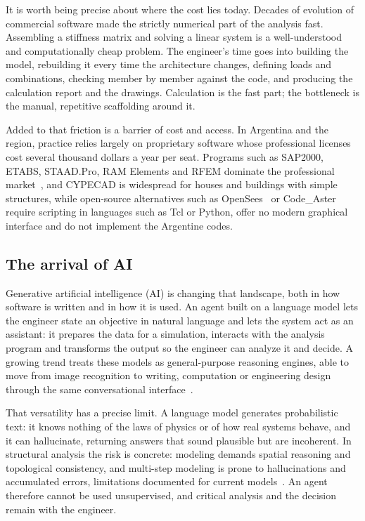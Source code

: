 \documentclass[11pt,a4paper]{article}
\begin{document}
It is worth being precise about where the cost lies today. Decades of evolution of commercial software made the strictly numerical part of the analysis fast. Assembling a stiffness matrix and solving a linear system is a well-understood and computationally cheap problem. The engineer's time goes into building the model, rebuilding it every time the architecture changes, defining loads and combinations, checking member by member against the code, and producing the calculation report and the drawings. Calculation is the fast part; the bottleneck is the manual, repetitive scaffolding around it.

Added to that friction is a barrier of cost and access. In Argentina and the region, practice relies largely on proprietary software whose professional licenses cost several thousand dollars a year per seat. Programs such as SAP2000, ETABS, STAAD.Pro, RAM Elements and RFEM dominate the professional market~\cite{ref1}, and CYPECAD is widespread for houses and buildings with simple structures, while open-source alternatives such as OpenSees~\cite{ref2} or Code\_Aster~\cite{ref3} require scripting in languages such as Tcl or Python, offer no modern graphical interface and do not implement the Argentine codes.

\subsection{The arrival of AI}\label{sec:1.2}

Generative artificial intelligence (AI) is changing that landscape, both in how software is written and in how it is used. An agent built on a language model lets the engineer state an objective in natural language and lets the system act as an assistant: it prepares the data for a simulation, interacts with the analysis program and transforms the output so the engineer can analyze it and decide. A growing trend treats these models as general-purpose reasoning engines, able to move from image recognition to writing, computation or engineering design through the same conversational interface~\cite{ref4,ref5}.

That versatility has a precise limit. A language model generates probabilistic text: it knows nothing of the laws of physics or of how real systems behave, and it can hallucinate, returning answers that sound plausible but are incoherent. In structural analysis the risk is concrete: modeling demands spatial reasoning and topological consistency, and multi-step modeling is prone to hallucinations and accumulated errors, limitations documented for current models~\cite{ref6,ref7}. An agent therefore cannot be used unsupervised, and critical analysis and the decision remain with the engineer.
\end{document}
